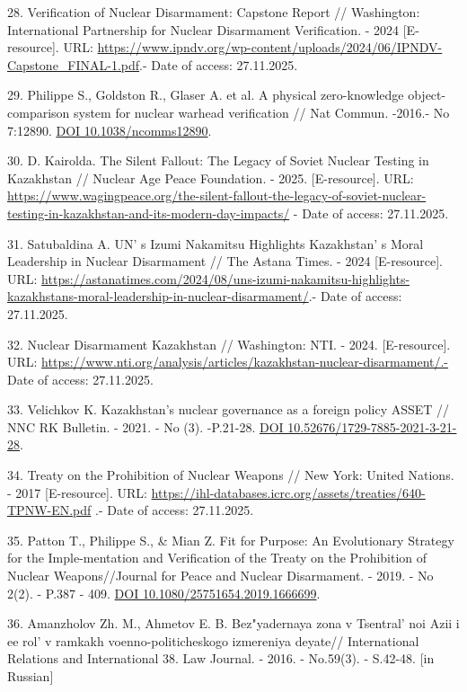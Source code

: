 \begin{refs}
28. Verification of Nuclear Disarmament: Capstone Report // Washington:
International Partnership for Nuclear Disarmament Verification. - 2024
{[}E-resource{]}. URL:
\url{https://www.ipndv.org/wp-content/uploads/2024/06/IPNDV-Capstone_FINAL-1.pdf}.-
Date of access: 27.11.2025.

29. Philippe S., Goldston R., Glaser A. et al. A physical zero-knowledge
object-comparison system for nuclear warhead verification // Nat Commun.
-2016.- No 7:12890. \href{https://doi.org/10.1038/ncomms12890}{DOI
10.1038/ncomms12890}.

30. D. Kairolda. The Silent Fallout: The Legacy of Soviet Nuclear
Testing in Kazakhstan // Nuclear Age Peace Foundation. - 2025.
{[}E-resource{]}. URL:
\url{https://www.wagingpeace.org/the-silent-fallout-the-legacy-of-soviet-nuclear-testing-in-kazakhstan-and-its-modern-day-impacts/} - Date of access: 27.11.2025.

31. Satubaldina A. UN' s Izumi Nakamitsu Highlights
Kazakhstan' s Moral Leadership in Nuclear Disarmament //
The Astana Times. - 2024 {[}E-resource{]}. URL:
\url{https://astanatimes.com/2024/08/uns-izumi-nakamitsu-highlights-kazakhstans-moral-leadership-in-nuclear-disarmament/}.- Date of access: 27.11.2025.

32. Nuclear Disarmament Kazakhstan // Washington: NTI. - 2024.
{[}E-resource{]}. URL:
\url{https://www.nti.org/analysis/articles/kazakhstan-nuclear-disarmament/.-}
Date of access: 27.11.2025.

33. Velichkov K. Kazakhstan's nuclear governance as a foreign policy
ASSET // NNC RK Bulletin. - 2021. - No (3). -P.21-28.
\href{https://doi.org/10.52676/1729-7885-2021-3-21-28}{DOI
10.52676/1729-7885-2021-3-21-28}.

34. Treaty on the Prohibition of Nuclear Weapons // New York: United
Nations. - 2017 {[}E-resource{]}. URL:
\href{https://ihl-databases.icrc.org/assets/treaties/640-TPNW-EN.pdf}{https://ihl-databases.icrc.org/assets/treaties/640-TPNW-EN.pdf}
.- Date of access: 27.11.2025.

35. Patton T., Philippe S., \& Mian Z. Fit for Purpose: An Evolutionary
Strategy for the Imple-mentation and Verification of the Treaty on the
Prohibition of Nuclear Weapons//Journal for Peace and Nuclear
Disarmament. - 2019. - No 2(2). - P.387 - 409.
\href{https://doi.org/10.1080/25751654.2019.1666699}{DOI
10.1080/25751654.2019.1666699}.

36. Amanzholov Zh. M., Ahmetov E. B. Bez"yadernaya zona v
Tsentral' noi Azii i ee rol'{} v ramkakh
voenno-politicheskogo izmereniya deyate// International Relations and
International 38. Law Journal. - 2016. - No.59(3). - S.42-48. {[}in
Russian{]}


\end{refs}
